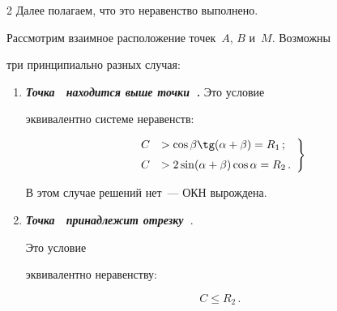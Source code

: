 \begin{multicols}{2}
Далее полагаем, что это неравенство выполнено.



     Рассмотрим взаимное расположение точек~$A$, $B$ и~$M$. Возможны

три принципиально разных случая:

     \begin{enumerate}[1.]

\item {\bfseries\textit{Точка~{} находится выше точки~{}.}} Это условие

эквивалентно системе неравенств:



\vspace*{1pt}



\noindent

\begin{equation}\left.

\begin{array}{rl}

C&> \cos\beta \tg(\alpha+\beta) =R_1\,;\\[6pt]

C&> 2\sin(\alpha+\beta)\cos\alpha =R_2\,.

\end{array}

\right\}

\label{3-zat}

\end{equation}



\vspace*{-2pt}



\noindent

В этом случае решений нет~--- ОКН вырождена.



\item

{\bfseries\textit{Точка~{} принадлежит отрезку~{\boldmath{$[A, B]$}}}}.

Это условие

эквивалентно неравенству:

\begin{equation}

C\leq R_2\,.

\label{e4-zat}

\end{equation}


\end{enumerate}
\end{multicols}
